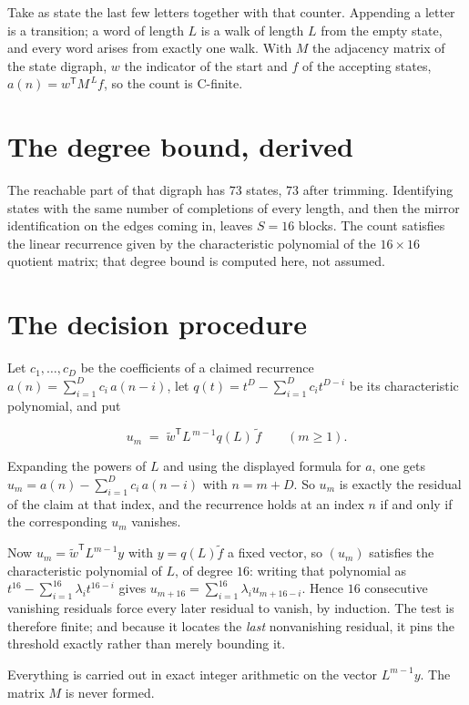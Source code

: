 \documentclass[11pt]{article}
\theoremstyle{definition}
\begin{document}
Take as state the last few letters together with that counter. Appending a letter is a transition; a word of length $L$ is a walk of length $L$ from the empty state, and every word arises from exactly one walk. With $M$ the adjacency matrix of the state digraph, $w$ the indicator of the start and $f$ of the accepting states, $a(n) = w^{\mathsf T}M^{\,L}f$, so the count is C-finite.

\section{The degree bound, derived}

The reachable part of that digraph has $73$ states, $73$ after trimming. Identifying states with the same number of completions of every length, and then the mirror identification on the edges coming in, leaves $S = 16$ blocks. The count satisfies the linear recurrence given by the characteristic polynomial of the $16\times16$ quotient matrix; that degree bound is computed here, not assumed.

\section{The decision procedure}

Let $c_1,\dots,c_D$ be the coefficients of a claimed recurrence $a(n) = \sum_{i=1}^{D} c_i\,a(n-i)$, let $q(t) = t^{D} - \sum_{i=1}^{D} c_i t^{D-i}$ be its characteristic polynomial, and put

\[u_m \;=\; \tilde w^{\mathsf T} L^{\,m-1} q(L)\,\tilde f \qquad (m \ge 1).\]

Expanding the powers of $L$ and using the displayed formula for $a$, one gets $u_m = a(n) - \sum_{i=1}^{D} c_i\,a(n-i)$ with $n = m + D$. So $u_m$ is exactly the residual of the claim at that index, and the recurrence holds at an index $n$ if and only if the corresponding $u_m$ vanishes.

Now $u_m = \tilde w^{\mathsf T} L^{m-1} y$ with $y = q(L)\tilde f$ a fixed vector, so $(u_m)$ satisfies the characteristic polynomial of $L$, of degree $16$: writing that polynomial as $t^{16} - \sum_{i=1}^{16} \lambda_i t^{16-i}$ gives $u_{m+16} = \sum_{i=1}^{16} \lambda_i u_{m+16-i}$. Hence $16$ consecutive vanishing residuals force every later residual to vanish, by induction. The test is therefore finite; and because it locates the {\itshape last} nonvanishing residual, it pins the threshold exactly rather than merely bounding it.

Everything is carried out in exact integer arithmetic on the vector $L^{m-1}y$. The matrix $M$ is never formed.
\end{document}
